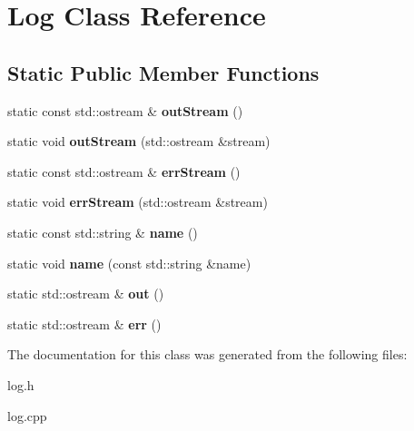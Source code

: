 \hypertarget{classLog}{}\section{Log Class Reference}
\label{classLog}
\subsection*{Static Public Member Functions}
\begin{DoxyCompactItemize}
\item 
static const std\+::ostream \& {\bfseries out\+Stream} ()\hypertarget{classLog_a27b116b095e6e08d5e40fd365210c657}{}\label{classLog_a27b116b095e6e08d5e40fd365210c657}

\item 
static void {\bfseries out\+Stream} (std\+::ostream \&stream)\hypertarget{classLog_ad5a9c8a9d7f84d36041f21058f450e53}{}\label{classLog_ad5a9c8a9d7f84d36041f21058f450e53}

\item 
static const std\+::ostream \& {\bfseries err\+Stream} ()\hypertarget{classLog_ac209747fd4964bc121818481ee131d19}{}\label{classLog_ac209747fd4964bc121818481ee131d19}

\item 
static void {\bfseries err\+Stream} (std\+::ostream \&stream)\hypertarget{classLog_ab2c566571ace5d3f234707ddfaaed4c9}{}\label{classLog_ab2c566571ace5d3f234707ddfaaed4c9}

\item 
static const std\+::string \& {\bfseries name} ()\hypertarget{classLog_a5a4518f9758b1eee0adcac1c3119288b}{}\label{classLog_a5a4518f9758b1eee0adcac1c3119288b}

\item 
static void {\bfseries name} (const std\+::string \&name)\hypertarget{classLog_a5758fde0052d1b682c6e2a33be192ecd}{}\label{classLog_a5758fde0052d1b682c6e2a33be192ecd}

\item 
static std\+::ostream \& {\bfseries out} ()\hypertarget{classLog_ab89f6644dd040b1fa07c1253cc12bafb}{}\label{classLog_ab89f6644dd040b1fa07c1253cc12bafb}

\item 
static std\+::ostream \& {\bfseries err} ()\hypertarget{classLog_ad37da894b6f997bc5204ed81cace26c2}{}\label{classLog_ad37da894b6f997bc5204ed81cace26c2}

\end{DoxyCompactItemize}


The documentation for this class was generated from the following files\+:\begin{DoxyCompactItemize}
\item 
log.\+h\item 
log.\+cpp\end{DoxyCompactItemize}
